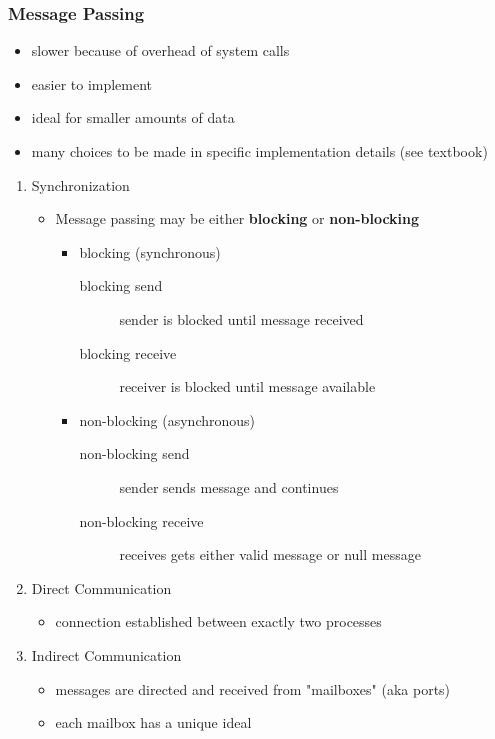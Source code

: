 \documentclass[11pt]{article}
\begin{document}
\subsubsection{Message Passing}
\label{sec:orgc71e9e9}
\begin{itemize}
\item slower because of overhead of system calls
\item easier to implement
\item ideal for smaller amounts of data
\item many choices to be made in specific implementation details (see textbook)
\end{itemize}
\begin{enumerate}
\item Synchronization
\label{sec:org0348c13}
\begin{itemize}
\item Message passing may be either \textbf{blocking} or \textbf{non-blocking}
\begin{itemize}
\item blocking (synchronous)
\begin{description}
\item[{blocking send}] sender is blocked until message received
\item[{blocking receive}] receiver is blocked until message available
\end{description}
\item non-blocking (asynchronous)
\begin{description}
\item[{non-blocking send}] sender sends message and continues
\item[{non-blocking receive}] receives gets either valid message or null message
\end{description}
\end{itemize}
\end{itemize}
\item Direct Communication
\label{sec:org4952e54}
\begin{itemize}
\item connection established between exactly two processes
\end{itemize}
\item Indirect Communication
\label{sec:org9cdf6c8}
\begin{itemize}
\item messages are directed and received from "mailboxes" (aka ports)
\item each mailbox has a unique ideal

\end{itemize}
\end{enumerate}
\end{document}
